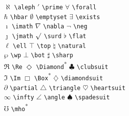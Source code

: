 \begin{table}[!htbp]
\caption[Verschiedene sonstige Symbole]%
        {Verschiedene sonstige Symbole
         (* benötigt Paket \texttt{latexsym})}
\begin{symbols}
$\aleph $\> \lstinline|\aleph| \>$\prime $\> \lstinline|\prime| \>
$\forall $\> \lstinline|\forall|  \\
$\hbar $\> \lstinline|\hbar| \>$\emptyset $\> \lstinline|\emptyset| \>
$\exists $\> \lstinline|\exists|  \\
$\imath $\> \lstinline|\imath| \>$\nabla $\> \lstinline|\nabla| \>
$\neg $\> \lstinline|\neg|  \\
$\jmath $\> \lstinline|\jmath| \>$\surd $\> \lstinline|\surd| \>
$\flat $\> \lstinline|\flat| \\
$\ell $\> \lstinline|\ell| \>$\top $\> \lstinline|\top| \>
$\natural $\> \lstinline|\natural| \\
$\wp $\> \lstinline|\wp| \>$\bot $\> \lstinline|\bot| \>$\sharp $\> \lstinline|\sharp| \\
$\Re $\> \lstinline|\Re| \>$\Diamond $\> \lstinline|\Diamond|\textsuperscript{*} \>$\clubsuit $\> \lstinline|\clubsuit| \\
$\Im $\> \lstinline|\Im| \>$\Box $\> \lstinline|\Box|\textsuperscript{*} \>$\diamondsuit $\>
\lstinline|\diamondsuit| \\
$\partial $\> \lstinline|\partial| \>$\triangle $\> \lstinline|\triangle| \>
$\heartsuit $\> \lstinline|\heartsuit| \\
$\infty $\> \lstinline|\infty| \>$\angle $\> \lstinline|\angle| \>
$\spadesuit $\> \lstinline|\spadesuit| \\
$\mho $\> \lstinline|\mho|\textsuperscript{*} \\
\end{symbols}
\end{table}



